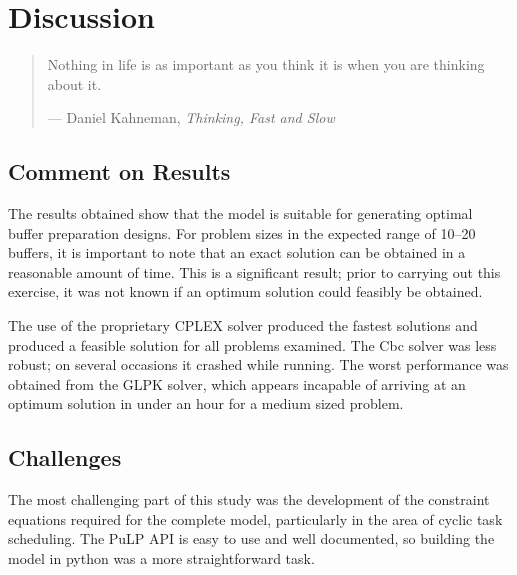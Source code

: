 %
%
%
%

\chapter{Discussion}\label{C.discussion}

\begin{quote}
Nothing in life is as important as you think it is when you are thinking about
it.

\hspace{2cm}--- Daniel Kahneman,
\emph{Thinking, Fast and Slow}
\end{quote}

\section{Comment on Results}\label{S.rescomment}
The results obtained show that the model is suitable for generating optimal
buffer preparation designs.
For problem sizes in the expected range of 10--20 buffers, it is important to
note that an exact solution can be obtained in a reasonable amount of time.
This is a significant result; prior to carrying out this exercise, it was not
known if an optimum solution could feasibly be obtained.

The use of the proprietary CPLEX solver produced the fastest solutions and
produced a feasible solution for all problems examined.
The Cbc solver was less robust; on several occasions it crashed while running.
The worst performance was obtained from the GLPK solver, which appears incapable
of arriving at an optimum solution in under an hour for a medium sized problem.

\section{Challenges}\label{S.challenges}
The most challenging part of this study was the development of the constraint
equations required for the complete model, particularly in the area of cyclic
task scheduling.  The PuLP API is easy to use and well documented, so building
the model in python was a more straightforward task.

